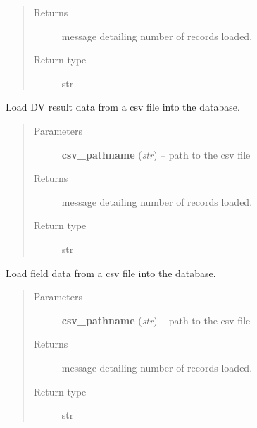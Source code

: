 \documentclass[letterpaper,10pt,english]{sphinxmanual}
\begin{document}
\begin{fulllineitems}
\begin{fulllineitems}
\begin{quote}
\begin{description}
\item[{Returns}] \leavevmode
message detailing number of records loaded.

\item[{Return type}] \leavevmode
str

\end{description}\end{quote}

\end{fulllineitems}


\begin{fulllineitems}
\label{modules:webb_utils.upload_data.UploadData.load_dv_results_data}
Load DV result data from a csv file into the database.
\begin{quote}\begin{description}
\item[{Parameters}] \leavevmode
\textbf{csv\_pathname} (\emph{str}) -- path to the csv file

\item[{Returns}] \leavevmode
message detailing number of records loaded.

\item[{Return type}] \leavevmode
str

\end{description}\end{quote}

\end{fulllineitems}


\begin{fulllineitems}
\label{modules:webb_utils.upload_data.UploadData.load_field_data}
Load field data from a csv file into the database.
\begin{quote}\begin{description}
\item[{Parameters}] \leavevmode
\textbf{csv\_pathname} (\emph{str}) -- path to the csv file

\item[{Returns}] \leavevmode
message detailing number of records loaded.

\item[{Return type}] \leavevmode
str


\end{description}
\end{quote}
\end{fulllineitems}
\end{fulllineitems}
\end{document}
